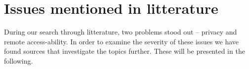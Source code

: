\section{Issues mentioned in litterature}
During our search through litterature, two problems stood out -- privacy and remote access-ability.
In order to examine the severity of these issues we have found sources that investigate the topics further.
These will be presented in the following.

